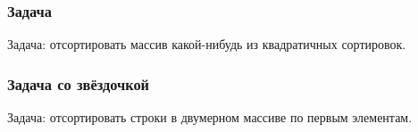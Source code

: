 \documentclass{../../slides-style}
\begin{document}
    
    \begin{frame}[plain]
        \titlepage
    \end{frame}

    \begin{frame}
        \frametitle{Задача}
        Задача: отсортировать массив какой-нибудь из квадратичных сортировок.
    \end{frame}

    \begin{frame}
        \frametitle{Задача со звёздочкой}
        Задача: отсортировать строки в двумерном массиве по первым элементам.
    \end{frame}
\end{document}
